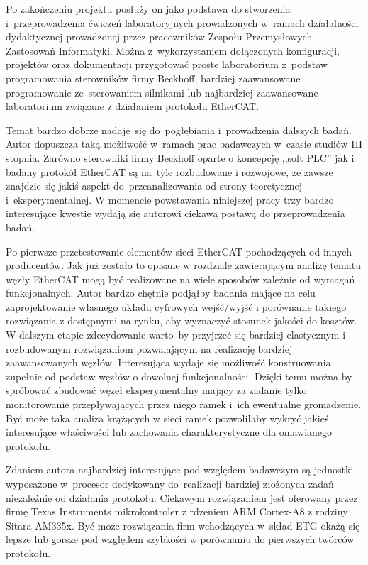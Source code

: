 Po zakończeniu projektu posłuży on jako podstawa do stworzenia i~przeprowadzenia ćwiczeń laboratoryjnych prowadzonych w~ramach działalności dydaktycznej prowadzonej przez pracowników Zespołu Przemysłowych Zastosowań Informatyki. Można z~wykorzystaniem dołączonych konfiguracji, projektów oraz dokumentacji przygotować proste laboratorium z~podstaw programowania sterowników firmy Beckhoff, bardziej zaawansowane programowanie ze~sterowaniem silnikami lub najbardziej zaawansowane laboratorium związane z działaniem protokołu EtherCAT.

Temat bardzo dobrze nadaje~się do~pogłębiania i~prowadzenia dalszych badań. Autor dopuszcza taką możliwość w~ramach prac badawczych w~czasie studiów III stopnia. Zarówno sterowniki firmy Beckhoff oparte o koncepcję ,,soft PLC'' jak i badany protokół EtherCAT są na~tyle rozbudowane i rozwojowe, że zawsze znajdzie się jakiś aspekt do~przeanalizowania od strony teoretycznej i~eksperymentalnej. W momencie powstawania niniejszej pracy trzy bardzo interesujące kwestie wydają się autorowi ciekawą postawą do przeprowadzenia badań.

Po pierwsze przetestowanie elementów sieci EtherCAT pochodzących od innych producentów. 
Jak już zostało to opisane w rozdziale zawierającym analizę tematu węzły EtherCAT mogą być realizowane na wiele sposobów zależnie od wymagań funkcjonalnych. Autor bardzo chętnie podjąłby badania mające na celu zaprojektowanie własnego układu cyfrowych wejść/wyjść i porównanie takiego rozwiązania z dostępnymi na rynku, aby wyznaczyć stosunek jakości do kosztów. W dalszym etapie zdecydowanie warto~by przyjrzeć się bardziej elastycznym i rozbudowanym rozwiązaniom pozwalającym na realizację bardziej zaawansowanych węzłów.
Interesująca wydaje się możliwość konstruowania zupełnie od podstaw węzłów o dowolnej funkcjonalności. Dzięki temu można by spróbować zbudować węzeł eksperymentalny mający za zadanie tylko monitorowanie przepływających przez niego ramek i~ich ewentualne gromadzenie. Być może taka analiza krążących w sieci ramek pozwoliłaby wykryć jakieś interesujące właściwości lub zachowania charakterystyczne dla omawianego protokołu.

Zdaniem autora najbardziej interesujące pod względem badawczym są jednostki wyposażone w~procesor dedykowany do~realizacji bardziej złożonych zadań niezależnie od działania protokołu. Ciekawym rozwiązaniem jest oferowany przez firmę Texas Instruments mikrokontroler z rdzeniem ARM Cortex-A8 z rodziny Sitara AM335x. Być może rozwiązania firm wchodzących w~skład ETG okażą się lepsze lub gorsze pod względem szybkości w porównaniu do pierwszych twórców protokołu.

